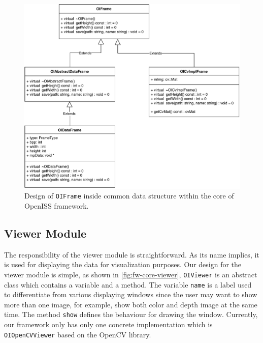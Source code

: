 \begin{figure}
    \centering
    \includegraphics[width=\linewidth]{figures/framework_core_oiframe.pdf}
    \caption[Design of \texttt{OIFrame} in the common data structure module]
    {Design of \texttt{OIFrame} inside common data structure within the core
        of OpenISS framework.}
    \label{fig:fw-core-oiframe}
\end{figure}

\subsection{Viewer Module}
\label{sec:fw-design-core-viewer}

The responsibility of the viewer module is straightforward. 
As its name implies, it is used for displaying the data for visualization 
purposes. 
Our design for the viewer module is simple, as shown in
\autoref{fig:fw-core-viewer}, \texttt{OIViewer} is an abstract class which
contains a variable and a method. The variable \texttt{name} is a label used
to differentiate from various displaying windows since the user may want to
show more than one image, for example, show both color and depth image at the
same time.
The method \texttt{show} defines the behaviour for drawing the window.
Currently, our framework only has only one concrete implementation which
is \texttt{OIOpenCVViewer} based on the OpenCV library.

